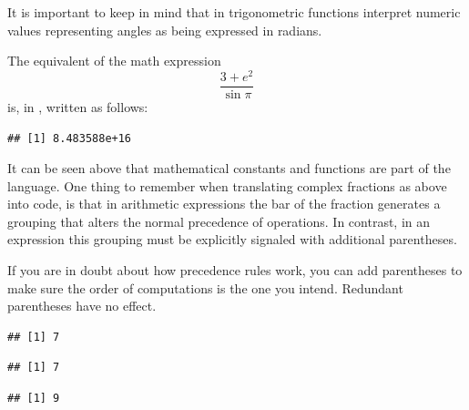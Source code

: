 \documentclass[krantz2]{krantz}\usepackage{knitr}
\begin{document}
It is important to keep in mind that in \Rlang trigonometric functions interpret numeric values representing angles as being expressed in radians.

The equivalent of the math expression
$$
\frac{3 + e^2}{\sin \pi}
$$
is, in \Rlang, written as follows:

\begin{knitrout}\footnotesize
{}\color{fgcolor}\begin{kframe}
\begin{alltt}
\hlstd{(} \hlopt{+} \hlstd{(}\hlstd{))} \hlopt{/} 
\end{alltt}
\begin{verbatim}
## [1] 8.483588e+16
\end{verbatim}
\end{kframe}
\end{knitrout}

It can be seen above that mathematical constants and functions are part of the \Rlang language. One thing to remember when translating complex fractions as above into \Rlang code, is that in arithmetic expressions the bar of the fraction generates a grouping that alters the normal precedence of operations. In contrast, in an \Rlang expression this grouping must be explicitly signaled with additional parentheses.

If you are in doubt about how precedence rules work, you can add parentheses to make sure the order of computations is the one you intend. Redundant parentheses have no effect.

\begin{knitrout}\footnotesize
{}\color{fgcolor}\begin{kframe}
\begin{alltt}
 \hlopt{+}  \hlopt{*} 
\end{alltt}
\begin{verbatim}
## [1] 7
\end{verbatim}
\begin{alltt}
 \hlopt{+} \hlstd{(} \hlopt{*} \hlstd{)}
\end{alltt}
\begin{verbatim}
## [1] 7
\end{verbatim}
\begin{alltt}
\hlstd{(} \hlopt{+} \hlstd{)} \hlopt{*} 
\end{alltt}
\begin{verbatim}
## [1] 9
\end{verbatim}
\end{kframe}
\end{knitrout}
\end{document}
